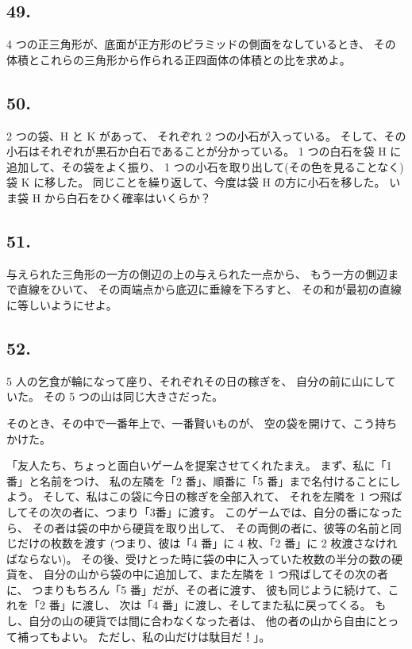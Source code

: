 \begin{flushright}
[9/2/81]
\end{flushright}

\subsection*{49.}

 4 つの正三角形が、底面が正方形のピラミッドの側面をなしているとき、
その体積とこれらの三角形から作られる正四面体の体積との比を求めよ。

\begin{flushright}
[16/11/86]
\end{flushright}

\subsection*{50.}

 2 つの袋、H と K があって、
それぞれ 2 つの小石が入っている。
そして、その小石はそれぞれが黒石か白石であることが分かっている。
 1 つの白石を袋 H に追加して、その袋をよく振り、
 1 つの小石を取り出して(その色を見ることなく)袋 K に移した。
同じことを繰り返して、今度は袋 H の方に小石を移した。
いま袋 H から白石をひく確率はいくらか？

\subsection*{51.}

与えられた三角形の一方の側辺の上の与えられた一点から、
もう一方の側辺まで直線をひいて、
その両端点から底辺に垂線を下ろすと、
その和が最初の直線に等しいようにせよ。

\begin{flushright}
[12/81]
\end{flushright}

\subsection*{52.}

5 人の乞食が輪になって座り、それぞれその日の稼ぎを、
自分の前に山にしていた。
その 5 つの山は同じ大きさだった。

そのとき、その中で一番年上で、一番賢いものが、
空の袋を開けて、こう持ちかけた。

「友人たち、ちょっと面白いゲームを提案させてくれたまえ。
まず、私に「1 番」と名前をつけ、
私の左隣を「2 番」、順番に「5 番」まで名付けることにしよう。
そして、私はこの袋に今日の稼ぎを全部入れて、
それを左隣を 1 つ飛ばしてその次の者に、つまり「3番」に渡す。
このゲームでは、自分の番になったら、
その者は袋の中から硬貨を取り出して、
その両側の者に、彼等の名前と同じだけの枚数を渡す
(つまり、彼は「4 番」に 4 枚、「2 番」に 2 枚渡さなければならない)。
その後、受けとった時に袋の中に入っていた枚数の半分の数の硬貨を、
自分の山から袋の中に追加して、また左隣を 1 つ飛ばしてその次の者に、
つまりもちろん「5 番」だが、その者に渡す、
彼も同じように続けて、これを「2 番」に渡し、
次は「4 番」に渡し、そしてまた私に戻ってくる。
もし、自分の山の硬貨では間に合わなくなった者は、
他の者の山から自由にとって補ってもよい。
ただし、私の山だけは駄目だ！」。


